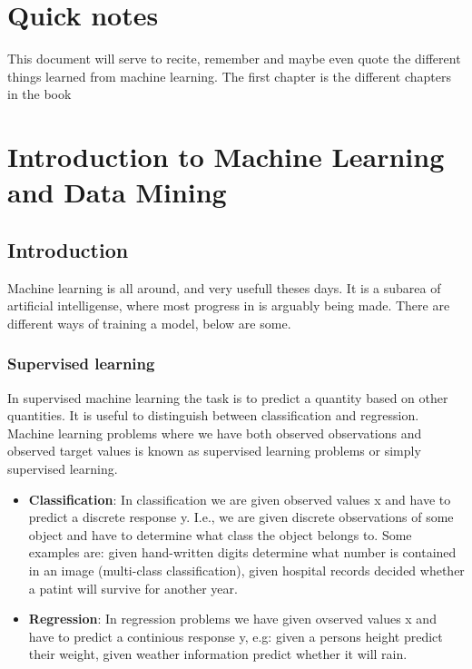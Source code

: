 \documentclass{article}
\begin{document}
\section{Quick notes}
This document will serve to recite, remember and maybe even quote the different things learned from machine learning.
The first chapter is the different chapters in the book \cite{MACHINE:TUE}

\section{Introduction to Machine Learning and Data Mining}
\subsection{Introduction}
Machine learning is all around, and very usefull theses days. It is a subarea of artificial intelligense, where most progress in is arguably being made. There are different ways of training a model, below are some.
\subsubsection{Supervised learning}
In supervised machine learning the task is to predict a quantity based on other quantities. It is useful to distinguish between classiﬁcation and regression. Machine learning problems where we have both observed observations and observed target values is known as supervised learning problems or simply supervised learning.
\begin{itemize}
    \item \textbf{Classification}: 
        In classiﬁcation we are given observed values x and have to predict a discrete response y. I.e., we are given discrete observations of some object and have to determine what class the object belongs to. Some examples are: given hand-written digits determine what number is contained in an image (multi-class classification), given hospital records decided whether a patint will survive for another year.
    \item \textbf{Regression}: 
        In regression problems we have given ovserved values x and have to predict a continious response y, e.g: given a persons height predict their weight, given weather information predict whether it will rain.
\end{itemize}
\end{document}
